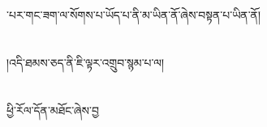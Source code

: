 ་པར་གང་ཟག་ལ་སོགས་པ་ཡོད་པ་ནི་མ་ཡིན་ནོ་ཞེས་བསྟན་པ་ཡིན་ནོ།\chapter{ }།འདི་ཐམས་ཅད་ནི་ཇི་ལྟར་འགྲུབ་སྙམ་པ་ལ།\chapter{ }ཕྱི་རོལ་དོན་མཐོང་ཞེས་བྱ